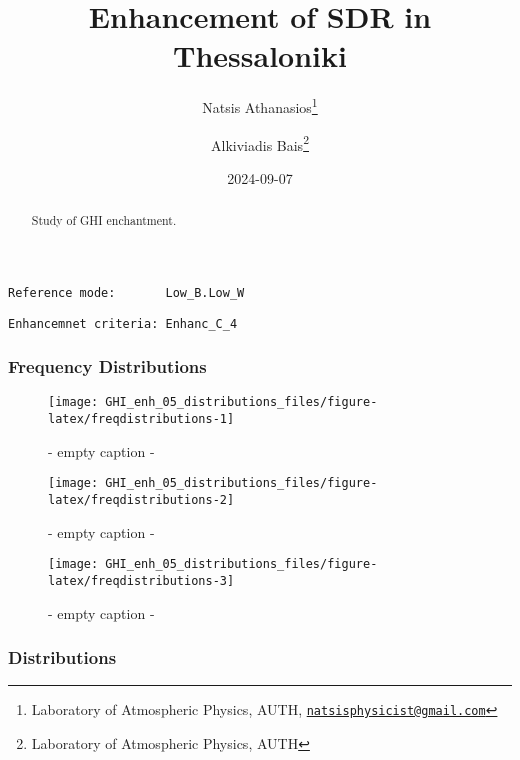 \documentclass[
  10pt,
  a4paper,oneside]{article}
\title{Enhancement of SDR in Thessaloniki}
\author{Natsis Athanasios\footnote{Laboratory of Atmospheric Physics, AUTH, \href{mailto:natsisphysicist@gmail.com}{\nolinkurl{natsisphysicist@gmail.com}}} \and Alkiviadis Bais\footnote{Laboratory of Atmospheric Physics, AUTH}}
\date{2024-09-07}
\begin{document}
\maketitle
\begin{abstract}
Study of GHI enchantment.
\end{abstract}

{
\hypersetup{linkcolor=}
\setcounter{tocdepth}{4}
\tableofcontents
}
\begin{verbatim}
Reference mode:       Low_B.Low_W 
\end{verbatim}

\begin{verbatim}
Enhancemnet criteria: Enhanc_C_4 
\end{verbatim}

\FloatBarrier

\hypertarget{frequency-distributions}{%
\subsubsection{Frequency Distributions}\label{frequency-distributions}}

\begin{figure}[H]

{\centering \texttt{[image: GHI\_enh\_05\_distributions\_files/figure-latex/freqdistributions-1]} 

}

\caption{ - empty caption - }\label{fig:freqdistributions-1}
\end{figure}
\begin{figure}[H]

{\centering \texttt{[image: GHI\_enh\_05\_distributions\_files/figure-latex/freqdistributions-2]} 

}

\caption{ - empty caption - }\label{fig:freqdistributions-2}
\end{figure}
\begin{figure}[H]

{\centering \texttt{[image: GHI\_enh\_05\_distributions\_files/figure-latex/freqdistributions-3]} 

}

\caption{ - empty caption - }\label{fig:freqdistributions-3}
\end{figure}

\FloatBarrier

\hypertarget{distributions}{%
\subsubsection{Distributions}\label{distributions}}
\end{document}

